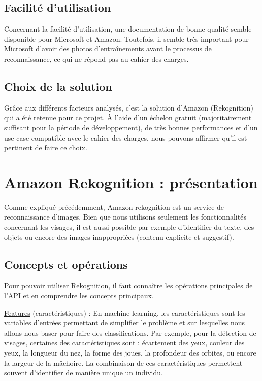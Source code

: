 \subsection{Facilité d’utilisation}
Concernant la facilité d’utilisation, une documentation de bonne qualité semble disponible pour Microsoft et
Amazon. Toutefois, il semble très important pour Microsoft d’avoir des photos d’entraînements avant le processus
de reconnaissance, ce qui ne répond pas au cahier des charges.

\subsection{Choix de la solution}
Grâce aux différents facteurs analysés, c’est la solution d’Amazon (Rekognition) qui a été retenue pour ce projet. À
l’aide d’un échelon gratuit (majoritairement suffisant pour la période de développement), de très bonnes performances
et d’un use case compatible avec le cahier des charges, nous pouvons affirmer qu’il est pertinent de faire ce choix.

\section{Amazon Rekognition : présentation}
Comme expliqué précédemment, Amazon rekognition est un service de reconnaissance d’images. Bien que nous
utilisons seulement les fonctionnalités concernant les visages, il est aussi possible par exemple d’identifier du texte,
des objets ou encore des images inappropriées (contenu explicite et suggestif).

\subsection{Concepts et opérations}
Pour pouvoir utiliser Rekognition, il faut connaître les opérations principales de l’API et en comprendre les concepts
principaux.

\underline{Features} (caractéristiques) : En machine learning, les caractéristiques sont les variables d’entrées permettant de
simplifier le problème et sur lesquelles nous allons nous baser pour faire des classifications. Par exemple, pour la
détection de visages, certaines des caractéristiques sont : écartement des yeux, couleur des yeux, la longueur du
nez, la forme des joues, la profondeur des orbites, ou encore la largeur de la mâchoire. La combinaison de ces
caractéristiques permettent souvent d’identifier de manière unique un individu.

